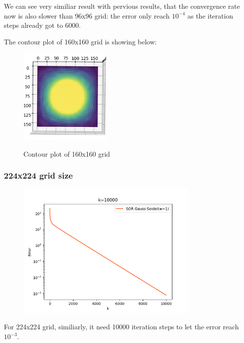 \documentclass[12pt]{article}
\begin{document}
We can see very similiar result with pervious results, that the convergence rate
now is also slower than 96x96 grid: the error only reach $10^{-4} $ as the iteration
steps already got to 6000.



The contour plot of 160x160 grid is showing below:
\begin{figure}[H]
    \centering
    \includegraphics[width=0.4\textwidth]{grdi160show.jpg}
    \label{aP=160.png}
    \caption{Contour plot of 160x160 grid}
\end{figure}



\subsubsection{224x224 grid size}


\begin{figure}[H]
    \centering
    \includegraphics[width=0.8\textwidth]{aP=224.png}
    \label{aP=224.png}
\end{figure}

For 224x224 grid, similiarly, it need 10000 iteration steps to let the error reach 
$10^{-3}$.
\end{document}
